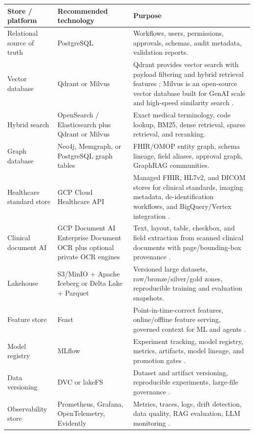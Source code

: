 \begin{longtable}{p{}p{}p{}}
\toprule
\textbf{Store / platform} & \textbf{Recommended technology} & \textbf{Purpose} \\
\midrule
Relational source of truth & PostgreSQL & Workflows, users, permissions, approvals, schemas, audit metadata, validation reports. \\
\addlinespace
Vector database & Qdrant or Milvus & Qdrant provides vector search with payload filtering and hybrid retrieval features \cite{qdrant}; Milvus is an open-source vector database built for GenAI scale and high-speed similarity search \cite{milvus}. \\
\addlinespace
Hybrid search & OpenSearch / Elasticsearch plus Qdrant or Milvus & Exact medical terminology, code lookup, BM25, dense retrieval, sparse retrieval, and reranking. \\
\addlinespace
Graph database & Neo4j, Memgraph, or PostgreSQL graph tables & FHIR/OMOP entity graph, schema lineage, field aliases, approval graph, GraphRAG communities. \\
\addlinespace
Healthcare standard store & GCP Cloud Healthcare API & Managed FHIR, HL7v2, and DICOM stores for clinical standards, imaging metadata, de-identification workflows, and BigQuery/Vertex integration \cite{gcpHealthcare}. \\
\addlinespace
Clinical document AI & GCP Document AI Enterprise Document OCR plus optional private OCR engines & Text, layout, table, checkbox, and field extraction from scanned clinical documents with page/bounding-box provenance \cite{gcpDocumentAI}. \\
\addlinespace
Lakehouse & S3/MinIO + Apache Iceberg or Delta Lake + Parquet & Versioned large datasets, raw/bronze/silver/gold zones, reproducible training and evaluation snapshots. \\
\addlinespace
Feature store & Feast & Point-in-time-correct features, online/offline feature serving, governed context for ML and agents \cite{feast}. \\
\addlinespace
Model registry & MLflow & Experiment tracking, model registry, metrics, artifacts, model lineage, and promotion gates \cite{mlflowRegistry}. \\
\addlinespace
Data versioning & DVC or lakeFS & Dataset and artifact versioning, reproducible experiments, large-file governance \cite{dvc}. \\
\addlinespace
Observability store & Prometheus, Grafana, OpenTelemetry, Evidently & Metrics, traces, logs, drift detection, data quality, RAG evaluation, LLM monitoring \cite{opentelemetry,prometheus,evidently}. \\
\bottomrule
\end{longtable}

